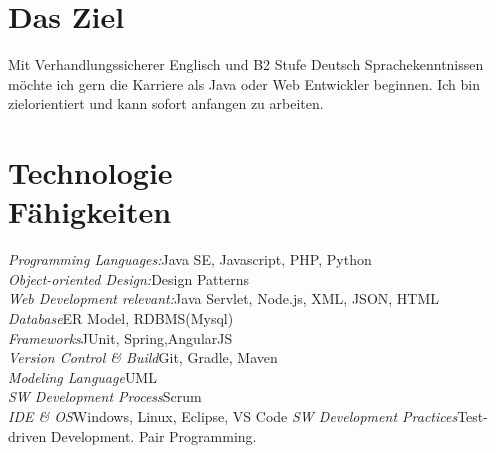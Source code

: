 \documentclass[margin, 10pt]{res} %
\begin{document}
\begin{resume}

 
\section{Das Ziel}  


Mit Verhandlungssicherer Englisch und B2 Stufe Deutsch Sprachekenntnissen möchte ich gern die Karriere als Java oder Web Entwickler beginnen. Ich bin zielorientiert und kann sofort anfangen zu arbeiten.

\newcommand\tab[1][1cm]{\hspace*{#1}}
\section{Technologie \\ Fähigkeiten} 

{\sl Programming Languages:}\hfill		Java SE, Javascript, PHP, Python\\
{\sl Object-oriented Design:}\hfill 		Design Patterns\\
{\sl Web Development relevant:}\hfill 	Java Servlet, Node.js, XML, JSON, HTML\\
{\sl Database}\hfill 						ER Model, RDBMS(Mysql)\\ 
{\sl Frameworks}\hfill  					JUnit, Spring,AngularJS\\
{\sl Version Control \& Build}\hfill 	Git, Gradle, Maven\\
{\sl Modeling Language}\hfill 				UML\\
{\sl SW Development Process}\hfill 		Scrum\\
{\sl IDE \& OS}\hfill  					Windows, Linux, Eclipse, VS Code
{\sl SW Development Practices}\hfill	Test-driven Development. Pair Programming.


\end{resume}
\end{document}
